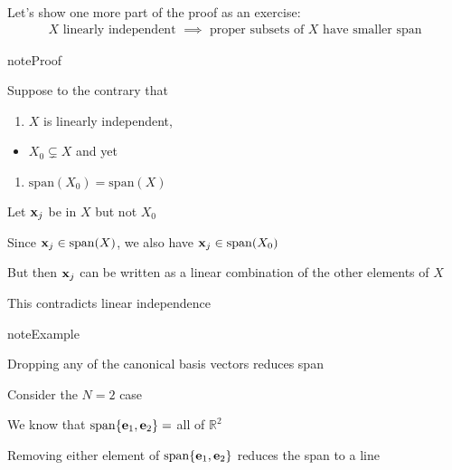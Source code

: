 \documentclass[letterpaper,10pt,english]{jupyterBook}
\begin{document}
\sphinxAtStartPar
Let’s show one more part of the proof as an exercise:
\begin{equation*}
\begin{split}
%
X \text{ linearly independent } 
\implies
\text{ proper subsets of $X$ have smaller span}
%
\end{split}
\end{equation*}
\begin{sphinxadmonition}{note}{Proof}

\sphinxAtStartPar
Suppose to the contrary that
\begin{enumerate}
%
\item {} 
\sphinxAtStartPar
\(X\) is linearly independent,

\end{enumerate}
\begin{itemize}
\item {} 
\sphinxAtStartPar
\(X_0 \subsetneq X\) and yet

\end{itemize}
\begin{enumerate}
%
\setcounter{enumi}{8}
\item {} 
\sphinxAtStartPar
\(\mathrm{span}(X_0) = \mathrm{span}(X)\)

\end{enumerate}

\sphinxAtStartPar
Let \({\bf x}_j\) be in \(X\) but not \(X_0\)

\sphinxAtStartPar
Since \({\bf x}_j \in \mathrm{span}(X)\), we also have \({\bf x}_j \in \mathrm{span}(X_0)\)

\sphinxAtStartPar
But then \({\bf x}_j\) can be written as a linear combination of the other elements of \(X\)

\sphinxAtStartPar
This contradicts linear independence
\end{sphinxadmonition}

\begin{sphinxadmonition}{note}{Example}

\sphinxAtStartPar
Dropping any of the canonical basis vectors reduces span
\end{sphinxadmonition}

\sphinxAtStartPar
Consider the \(N=2\) case

\sphinxAtStartPar
We know that \(\mathrm{span} \{{\bf e}_1, {\bf e}_2\} =\) all of \(\mathbb{R}^2\)

\sphinxAtStartPar
Removing either element of \(\mathrm{span} \{{\bf e}_1, {\bf e}_2\}\) reduces the span to a line
\end{document}
